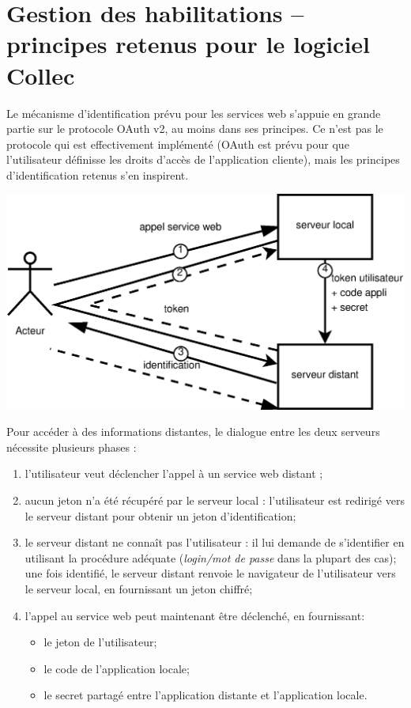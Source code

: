 \chapter{Gestion des habilitations -- principes retenus pour le logiciel Collec}
\label{oauth}

Le mécanisme d'identification prévu pour les services web s'appuie en grande partie sur le protocole OAuth v2, au moins dans ses principes. Ce n'est pas le protocole qui est effectivement implémenté (OAuth est prévu pour que l'utilisateur définisse les droits d'accès de l'application cliente), mais les principes d'identification retenus s'en inspirent.

\includegraphics[width=\linewidth]{images/appel_sw_identification}

Pour accéder à des informations distantes, le dialogue entre les deux serveurs nécessite plusieurs phases :
\begin{enumerate}
\item l'utilisateur veut déclencher l'appel à un service web distant ;
\item aucun jeton n'a été récupéré par le serveur local : l'utilisateur est redirigé vers le serveur distant pour obtenir un jeton d'identification;
\item le serveur distant ne connaît pas l'utilisateur : il lui demande de s'identifier en utilisant la procédure adéquate (\textit{login/mot de passe} dans la plupart des cas);
\\une fois identifié, le serveur distant renvoie le navigateur de l'utilisateur vers le serveur local, en fournissant un jeton chiffré;
\item l'appel au service web peut maintenant être déclenché, en fournissant:
\begin{itemize}
\item le jeton de l'utilisateur;
\item le code de l'application locale;
\item le secret partagé entre l'application distante et l'application locale.
\end{itemize}
\end{enumerate}


